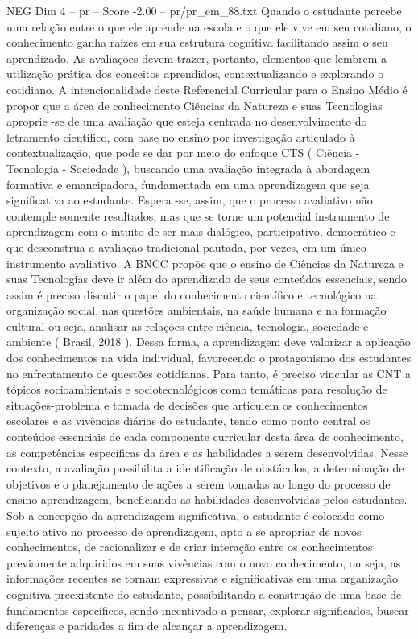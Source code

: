\begin{textsample}{NEG Dim 4 – pr – Score -2.00 – pr/pr\_em\_88.txt}
Quando o estudante percebe uma relação entre o que ele aprende na escola e o que ele vive em seu cotidiano, o conhecimento ganha raízes em sua estrutura cognitiva facilitando assim o seu aprendizado.
As avaliações devem trazer, portanto, elementos que lembrem a utilização prática dos conceitos aprendidos, contextualizando e explorando o cotidiano.
A intencionalidade deste Referencial Curricular para o Ensino Médio é propor que a área de conhecimento Ciências da Natureza e suas Tecnologias aproprie -se de uma avaliação que esteja centrada no desenvolvimento do letramento científico, com base no ensino por investigação articulado à contextualização, que pode se dar por meio do enfoque CTS ( Ciência - Tecnologia - Sociedade ), buscando uma avaliação integrada à abordagem formativa e emancipadora, fundamentada em uma aprendizagem que seja significativa ao estudante.
Espera -se, assim, que o processo avaliativo não contemple somente resultados, mas que se torne um potencial instrumento de aprendizagem com o intuito de ser mais dialógico, participativo, democrático e que desconstrua a avaliação tradicional pautada, por vezes, em um único instrumento avaliativo.
A BNCC propõe que o ensino de Ciências da Natureza e suas Tecnologias deve ir além do aprendizado de seus conteúdos essenciais, sendo assim é preciso discutir o papel do conhecimento científico e tecnológico na organização social, nas questões ambientais, na saúde humana e na formação cultural ou seja, analisar as relações entre ciência, tecnologia, sociedade e ambiente ( Brasil, 2018 ).
Dessa forma, a aprendizagem deve valorizar a aplicação dos conhecimentos na vida individual, favorecendo o protagonismo dos estudantes no enfrentamento de questões cotidianas.
Para tanto, é preciso vincular as CNT a tópicos socioambientais e sociotecnológicos como temáticas para resolução de situações-problema e tomada de decisões que articulem os conhecimentos escolares e as vivências diárias do estudante, tendo como ponto central os conteúdos essenciais de cada componente curricular desta área de conhecimento, as competências específicas da área e as habilidades a serem desenvolvidas.
Nesse contexto, a avaliação possibilita a identificação de obstáculos, a determinação de objetivos e o planejamento de ações a serem tomadas ao longo do processo de ensino-aprendizagem, beneficiando as habilidades desenvolvidas pelos estudantes.
Sob a concepção da aprendizagem significativa, o estudante é colocado como sujeito ativo no processo de aprendizagem, apto a se apropriar de novos conhecimentos, de racionalizar e de criar interação entre os conhecimentos previamente adquiridos em suas vivências com o novo conhecimento, ou seja, as informações recentes se tornam expressivas e significativas em uma organização cognitiva preexistente do estudante, possibilitando a construção de uma base de fundamentos específicos, sendo incentivado a pensar, explorar significados, buscar diferenças e paridades a fim de alcançar a aprendizagem.

\end{textsample}
